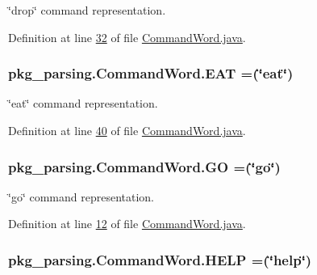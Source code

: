 \char`\"{}drop\char`\"{} command representation. 



Definition at line \hyperlink{CommandWord_8java_source_l00032}{32} of file \hyperlink{CommandWord_8java_source}{Command\-Word.\-java}.

\hypertarget{enumpkg__parsing_1_1CommandWord_a4fe488aea9cdd9ed9455682d42a300b3}{
\subsubsection[{E\-A\-T}]{\setlength{\rightskip}{0pt plus 5cm}pkg\-\_\-parsing.\-Command\-Word.\-E\-A\-T =(\char`\"{}eat\char`\"{})}}\label{enumpkg__parsing_1_1CommandWord_a4fe488aea9cdd9ed9455682d42a300b3}


\char`\"{}eat\char`\"{} command representation. 



Definition at line \hyperlink{CommandWord_8java_source_l00040}{40} of file \hyperlink{CommandWord_8java_source}{Command\-Word.\-java}.

\hypertarget{enumpkg__parsing_1_1CommandWord_a82b58f470d1dbcf2a9e5826632d66524}{
\subsubsection[{G\-O}]{\setlength{\rightskip}{0pt plus 5cm}pkg\-\_\-parsing.\-Command\-Word.\-G\-O =(\char`\"{}go\char`\"{})}}\label{enumpkg__parsing_1_1CommandWord_a82b58f470d1dbcf2a9e5826632d66524}


\char`\"{}go\char`\"{} command representation. 



Definition at line \hyperlink{CommandWord_8java_source_l00012}{12} of file \hyperlink{CommandWord_8java_source}{Command\-Word.\-java}.

\hypertarget{enumpkg__parsing_1_1CommandWord_ace035a3a624f4247b9f38c24eabe3f91}{
\subsubsection[{H\-E\-L\-P}]{\setlength{\rightskip}{0pt plus 5cm}pkg\-\_\-parsing.\-Command\-Word.\-H\-E\-L\-P =(\char`\"{}help\char`\"{})}}\label{enumpkg__parsing_1_1CommandWord_ace035a3a624f4247b9f38c24eabe3f91}


